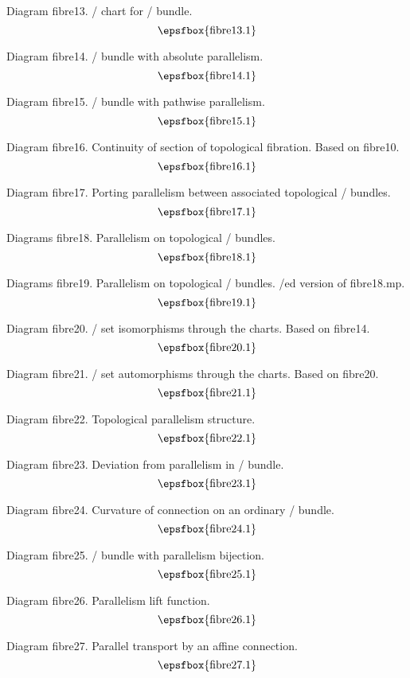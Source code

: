 Diagram fibre13. \Fibre/ chart for \fibre/ bundle.
$$
\centerline{\epsfbox{fibre13.1}}
$$

Diagram fibre14. \Fibre/ bundle with absolute parallelism.
$$
\centerline{\epsfbox{fibre14.1}}
$$

Diagram fibre15. \Fibre/ bundle with pathwise parallelism.
$$
\centerline{\epsfbox{fibre15.1}}
$$

\filleject

Diagram fibre16. Continuity of section of topological fibration. Based on
fibre10.
$$
\centerline{\epsfbox{fibre16.1}}
$$

Diagram fibre17. Porting parallelism between associated topological \fibre/
bundles.
$$
\centerline{\epsfbox{fibre17.1}}
$$

Diagrams fibre18. Parallelism on topological \fibre/ bundles.
$$
\centerline{\epsfbox{fibre18.1}}
$$

Diagrams fibre19. Parallelism on topological \fibre/ bundles. \Colour/ed version
of fibre18.mp.
$$
\centerline{\epsfbox{fibre19.1}}
$$

\filleject

Diagram fibre20. \Fibre/ set isomorphisms through the charts. Based on fibre14.
$$
\centerline{\epsfbox{fibre20.1}}
$$

Diagram fibre21. \Fibre/ set automorphisms through the charts. Based on fibre20.
$$
\centerline{\epsfbox{fibre21.1}}
$$

Diagram fibre22. Topological parallelism structure.
$$
\centerline{\epsfbox{fibre22.1}}
$$

Diagram fibre23. Deviation from parallelism in \fibre/ bundle.
$$
\centerline{\epsfbox{fibre23.1}}
$$

\filleject

Diagram fibre24. Curvature of connection on an ordinary \fibre/ bundle.
$$
\centerline{\epsfbox{fibre24.1}}
$$

Diagram fibre25. \Fibre/ bundle with parallelism bijection.
$$
\centerline{\epsfbox{fibre25.1}}
$$

Diagram fibre26. Parallelism lift function.
$$
\centerline{\epsfbox{fibre26.1}}
$$

\filleject

Diagram fibre27. Parallel transport by an affine connection.
$$
\centerline{\epsfbox{fibre27.1}}
$$

